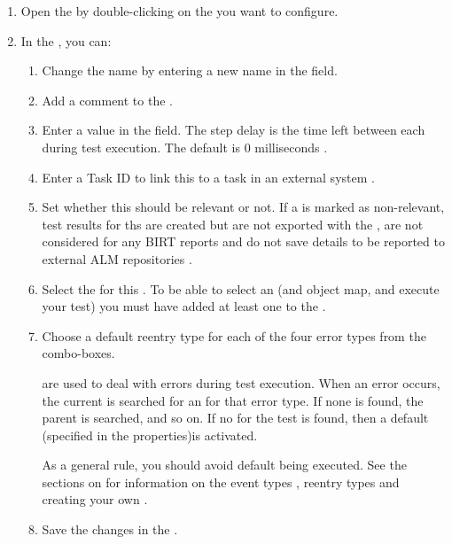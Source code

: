 \begin{enumerate}
\item Open the \gdtestsuiteeditor{} by double-clicking on the \gdsuite{} you want to configure. 
\item In the \gdpropview{}, you can:
\begin{enumerate}
\item Change the \gdsuite{} name by entering a new name in the  field.  
\item Add a comment to the \gdsuite{} . 
\item Enter a value in the  field. The step delay is the time left between each \gdstep{} during test execution. The default is 0 milliseconds .
\item Enter a Task ID to link this \gdsuite{} to a task in an external system .
\item Set whether this \gdsuite{} should be relevant or not. If a \gdsuite{} is marked as non-relevant, test results for ths \gdsuite{} are created but are not exported with the \gdproject{}, are not considered for any BIRT reports  and do not save details to be reported to external ALM repositories . 
\item Select the \gdaut{} for this \gdsuite{}. To be able to select an \gdaut{} (and object map, and execute your test) you must have added at least one \gdaut{} to the \gdproject{} .

\item Choose a default reentry type for each of the four error types  from the combo-boxes. 

\gdehandlers{} are \gdcases{} used to deal with errors during test execution. When an error occurs, the current \gdcase{} is searched for an \gdehandler{} for that error type. If none is found, the parent \gdcase{} is searched, and so on. If no \gdehandler{} for the test is found, then a default \gdehandler{} (specified in the \gdsuite{} properties)is activated.  

As a general rule, you should avoid default \gdehandlers{} being executed.
See the sections on \gdehandlers{} for information on the event types , reentry types  and creating your own \gdehandlers{}.
\item Save the changes in the \gdtestsuiteeditor{}.
\end{enumerate}
\end{enumerate}
